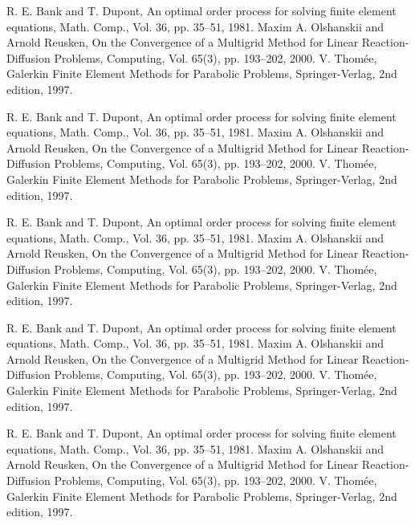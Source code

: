 \documentclass{report}
\begin{document}
\begin{thebibliography}{9}
 R. E. Bank and T. Dupont, An optimal order process for
solving finite element equations, Math. Comp., Vol. 36, pp. 35--51,
1981.
 Maxim A. Olshanskii and Arnold
Reusken, On the Convergence of a Multigrid Method for Linear
Reaction-Diffusion Problems, Computing, Vol. 65(3), pp. 193--202,
2000.
 V. Thom\'{e}e, Galerkin Finite Element Methods for
Parabolic Problems, Springer-Verlag, 2nd edition, 1997.










 R. E. Bank and T. Dupont, An optimal order process for
solving finite element equations, Math. Comp., Vol. 36, pp. 35--51,
1981.
 Maxim A. Olshanskii and Arnold
Reusken, On the Convergence of a Multigrid Method for Linear
Reaction-Diffusion Problems, Computing, Vol. 65(3), pp. 193--202,
2000.
 V. Thom\'{e}e, Galerkin Finite Element Methods for
Parabolic Problems, Springer-Verlag, 2nd edition, 1997.



 R. E. Bank and T. Dupont, An optimal order process for
solving finite element equations, Math. Comp., Vol. 36, pp. 35--51,
1981.
 Maxim A. Olshanskii and Arnold
Reusken, On the Convergence of a Multigrid Method for Linear
Reaction-Diffusion Problems, Computing, Vol. 65(3), pp. 193--202,
2000.
 V. Thom\'{e}e, Galerkin Finite Element Methods for
Parabolic Problems, Springer-Verlag, 2nd edition, 1997.




 R. E. Bank and T. Dupont, An optimal order process for
solving finite element equations, Math. Comp., Vol. 36, pp. 35--51,
1981.
 Maxim A. Olshanskii and Arnold
Reusken, On the Convergence of a Multigrid Method for Linear
Reaction-Diffusion Problems, Computing, Vol. 65(3), pp. 193--202,
2000.
 V. Thom\'{e}e, Galerkin Finite Element Methods for
Parabolic Problems, Springer-Verlag, 2nd edition, 1997.



 R. E. Bank and T. Dupont, An optimal order process for
solving finite element equations, Math. Comp., Vol. 36, pp. 35--51,
1981.
 Maxim A. Olshanskii and Arnold
Reusken, On the Convergence of a Multigrid Method for Linear
Reaction-Diffusion Problems, Computing, Vol. 65(3), pp. 193--202,
2000.
 V. Thom\'{e}e, Galerkin Finite Element Methods for
Parabolic Problems, Springer-Verlag, 2nd edition, 1997.




\end{thebibliography}
\end{document}
